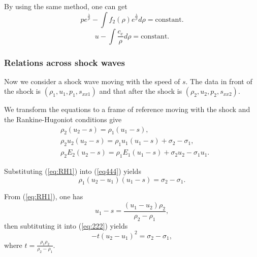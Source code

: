 \documentclass{article}
\numberwithin{equation}{section}
\numberwithin{table}{section}
\begin{document}
By using the same method, one can get
\begin{equation}\label{eq:prhoER}
  p e^{\frac{\lambda}{\rho}} - \int f_2(\rho) e^{\frac{\lambda}{\rho}}d\rho = \text{constant}.
\end{equation}
\begin{equation}\label{eq:urhoER}
  u-\int\frac{c_e}{\rho} d\rho = \text{constant}.
\end{equation}

\subsubsection{Relations across  shock waves}\label{sec:shock}
Now we consider a shock wave moving with the speed of $s$. The data in front of the shock is $(\rho_1,u_1,p_1,s_{xx1})$ and that after the shock is $(\rho_2,u_2,p_2,s_{xx2})$.

We transform the equations  to a frame of reference moving with the shock and the Rankine-Hugoniot conditions give
\begin{align}
\label{eq:RH1}
  &\rho_2(u_2-s) = \rho_1(u_1-s), \\
\label{eq444}
  &\rho_2u_2(u_2-s) = \rho_1u_1(u_1-s)+\sigma_2-\sigma_1,\\
\label{eq:RH3}
  &\rho_2E_2(u_2-s) = \rho_1E_1(u_1-s)+\sigma_2 u_2-\sigma_1u_1.
\end{align}

Substituting (\ref{eq:RH1}) into (\ref{eq444}) yields
\begin{equation}\label{eq:222}
  \rho_1(u_2-u_1)(u_1-s) = \sigma_2-\sigma_1.
\end{equation}

From (\ref{eq:RH1}), one has
\begin{equation}
  u_1-s = \frac{(u_1 - u_2)\rho_2}{\rho_2 -\rho_1},
\end{equation}
then subtituting it into (\ref{eq:222}) yields
\begin{equation}\label{eq:u2u1}
  -t(u_2-u_1)^2 = \sigma_2-\sigma_1,
\end{equation}
where $ t=\frac{\rho_1 \rho_2}{\rho_2-\rho_1}$.
\end{document}
